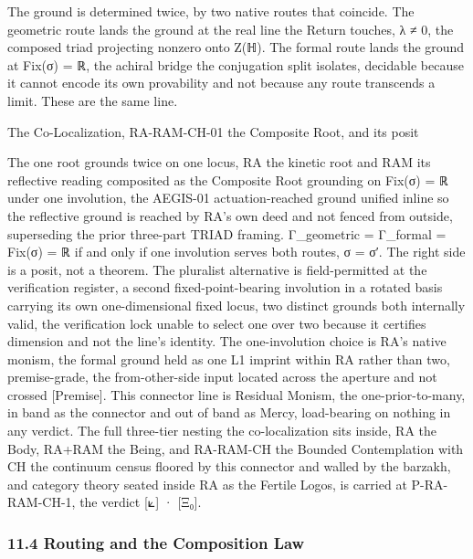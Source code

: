 \documentclass[10pt,twocolumn]{article}
\begin{document}
The ground is determined twice, by two native routes that coincide. The
geometric route lands the ground at the real line the Return touches, λ
≠ 0, the composed triad projecting nonzero onto Z(ℍ). The formal route
lands the ground at Fix(σ) = ℝ, the achiral bridge the conjugation split
isolates, decidable because it cannot encode its own provability and not
because any route transcends a limit. These are the same line.

\begin{jbox}{The Co-Localization, RA-RAM-CH-01 the Composite Root, and its posit}

The one root grounds twice on one locus, RA the kinetic root and RAM its
reflective reading composited as the Composite Root grounding on Fix(σ)
= ℝ under one involution, the AEGIS-01 actuation-reached ground unified
inline so the reflective ground is reached by RA's own deed and not
fenced from outside, superseding the prior three-part TRIAD framing.
Γ\_geometric = Γ\_formal = Fix(σ) = ℝ if and only if one involution
serves both routes, σ = σ′. The right side is a posit, not a theorem.
The pluralist alternative is field-permitted at the verification
register, a second fixed-point-bearing involution in a rotated basis
carrying its own one-dimensional fixed locus, two distinct grounds both
internally valid, the verification lock unable to select one over two
because it certifies dimension and not the line's identity. The
one-involution choice is RA's native monism, the formal ground held as
one L1 imprint within RA rather than two, premise-grade, the
from-other-side input located across the aperture and not crossed
{[}Premise{]}. This connector line is Residual Monism, the
one-prior-to-many, in band as the connector and out of band as Mercy,
load-bearing on nothing in any verdict. The full three-tier nesting the
co-localization sits inside, RA the Body, RA+RAM the Being, and
RA-RAM-CH the Bounded Contemplation with CH the continuum census floored
by this connector and walled by the barzakh, and category theory seated
inside RA as the Fertile Logos, is carried at P-RA-RAM-CH-1, the verdict
{[}⟀{]} · {[}Ξ₀{]}.

\end{jbox}

\hypertarget{routing-and-the-composition-law}{%
\subsubsection{11.4 Routing and the Composition
Law}\label{routing-and-the-composition-law}}
\end{document}
